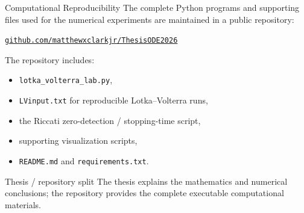 \documentclass[aspectratio=169,11pt]{beamer}
\begin{document}
\begin{frame}{Computational Reproducibility}
The complete Python programs and supporting files used for the numerical experiments are maintained in a public repository:

\vspace{0.55em}
\begin{center}
\large
\href{https://github.com/matthewxclarkjr/ThesisODE2026}{\textcolor{LSUPurple}{\texttt{github.com/matthewxclarkjr/ThesisODE2026}}}
\end{center}

\vspace{0.45em}
The repository includes:
\begin{itemize}
  \item \texttt{lotka\_volterra\_lab.py},
  \item \texttt{LVinput.txt} for reproducible Lotka--Volterra runs,
  \item the Riccati zero-detection / stopping-time script,
  \item supporting visualization scripts,
  \item \texttt{README.md} and \texttt{requirements.txt}.
\end{itemize}

\begin{alertblock}{Thesis / repository split}
The thesis explains the mathematics and numerical conclusions; the repository provides the complete executable computational materials.
\end{alertblock}
\end{frame}
\end{document}
